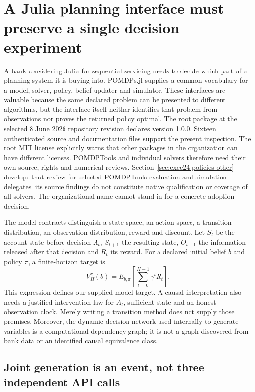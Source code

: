 \section{A Julia planning interface must preserve a single decision experiment}
\label{exec23:pomdpsjl-scope}

A bank considering Julia for sequential servicing needs to decide which part
of a planning system it is buying into. POMDPs.jl supplies a common vocabulary
for a model, solver, policy, belief updater and simulator. These interfaces are
valuable because the same declared problem can be presented to different
algorithms, but the interface itself neither identifies that problem from
observations nor proves the returned policy optimal. The root package at the
selected 8 June 2026 repository revision declares version 1.0.0. Sixteen
authenticated source and documentation files support the present inspection.
The root MIT license explicitly warns that other packages in the organization
can have different licenses. POMDPTools and individual solvers therefore need
their own source, rights and numerical reviews. Section~\ref{sec:exec24-policies-other}
develops that review for selected POMDPTools evaluation and simulation delegates;
its source findings do not constitute native qualification or coverage of all
solvers. The organizational name cannot stand in for a concrete adoption decision.
\citep{exec23_pomdpsjl_sources}

The model contracts distinguish a state space, an action space, a transition
distribution, an observation distribution, reward and discount. Let
$S_t$ be the account state before decision $A_t$, $S_{t+1}$ the resulting state,
$O_{t+1}$ the information released after that decision and $R_t$ its reward.
For a declared initial belief $b$ and policy $\pi$, a finite-horizon target is
\[
 V_H^\pi(b)=E_{b,\pi}\!\left[\sum_{t=0}^{H-1}\gamma^tR_t\right].
\]
This expression defines our supplied-model target. A causal interpretation
also needs a justified intervention law for $A_t$, sufficient state and an
honest observation clock. Merely writing a transition method does not supply
those premises. Moreover, the dynamic decision network used internally to
generate variables is a computational dependency graph; it is not a graph
discovered from bank data or an identified causal equivalence class.
\citep{exec23_pomdpsjl_sources,exec23_pomdpsjl_reference}

\subsection{Joint generation is an event, not three independent API calls}
\label{exec23:pomdpsjl-generation}

